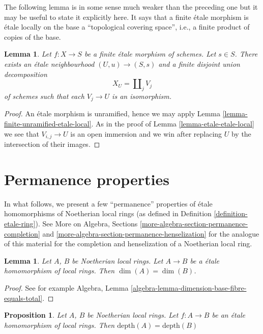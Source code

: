 \documentclass{stacks-project}
\theoremstyle{plain}
\newtheorem{proposition}[subsection]{Proposition}
\newtheorem{lemma}[subsection]{Lemma}
\theoremstyle{definition}
\theoremstyle{remark}
\numberwithin{equation}{subsection}
\begin{document}
\noindent
The following lemma is in some sense much weaker than the preceding one
but it may be useful to state it explicitly here. It says that a finite
\'etale morphism is \'etale locally on the base a
``topological covering space'', i.e., a finite product of copies of the base.

\begin{lemma}
\label{lemma-finite-etale-etale-local}
Let $f : X \to S$ be a finite \'etale morphism of schemes.
Let $s \in S$. There exists an \'etale neighbourhood $(U, u) \to (S, s)$
and a finite disjoint union decomposition
$$
X_U = \coprod\nolimits_j V_j
$$
of schemes such that each $V_j \to U$ is an isomorphism.
\end{lemma}

\begin{proof}
An \'etale morphism is unramified, hence we may apply
Lemma \ref{lemma-finite-unramified-etale-local}.
As in the proof of
Lemma \ref{lemma-etale-etale-local}
we see that $V_{i, j} \to U$ is an open immersion and we win
after replacing $U$ by the intersection of their images.
\end{proof}




\section{Permanence properties}
\label{section-properties-permanence}

\noindent
In what follows, we present a few ``permanence''
properties of \'etale homomorphisms of Noetherian local rings
(as defined in Definition \ref{definition-etale-ring}). See
More on Algebra, Sections \ref{more-algebra-section-permanence-completion} and
\ref{more-algebra-section-permanence-henselization}
for the analogue of this material for the completion and
henselization of a Noetherian local ring.

\begin{lemma}
\label{lemma-etale-dimension}
Let $A$, $B$ be Noetherian local rings.
Let $A \to B$ be a \'etale homomorphism of local rings.
Then $\dim(A) = \dim(B)$.
\end{lemma}

\begin{proof}
See for example
Algebra, Lemma \ref{algebra-lemma-dimension-base-fibre-equals-total}.
\end{proof}

\begin{proposition}
\label{proposition-etale-depth}
Let $A$, $B$ be Noetherian local rings.
Let $f : A \to B$ be an \'etale homomorphism of local rings.
Then $\text{depth}(A) = \text{depth}(B)$
\end{proposition}
\end{document}
